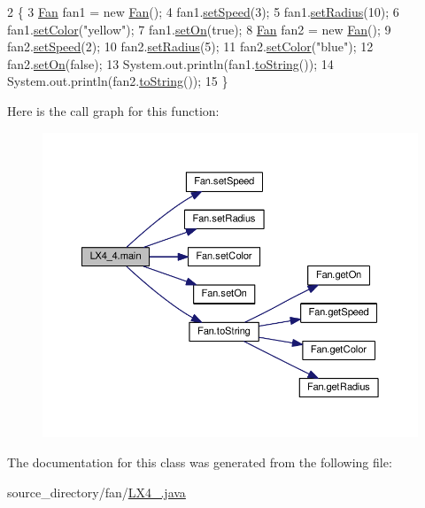 \begin{DoxyCode}
2                                            \{
3         \hyperlink{class_fan}{Fan} fan1 = \textcolor{keyword}{new} \hyperlink{class_fan}{Fan}();
4         fan1.\hyperlink{class_fan_af95cee271f2412a52ac920f00b6ac90a}{setSpeed}(3);
5         fan1.\hyperlink{class_fan_a13134b8be4efdd7403af98d763ce2199}{setRadius}(10);
6         fan1.\hyperlink{class_fan_afef0f6a39b56269a2592dcff067052d8}{setColor}(\textcolor{stringliteral}{"yellow"});
7         fan1.\hyperlink{class_fan_a4f7fd9e0ef71e219270d02ac36ad328b}{setOn}(\textcolor{keyword}{true});
8         \hyperlink{class_fan}{Fan} fan2 = \textcolor{keyword}{new} \hyperlink{class_fan}{Fan}();
9         fan2.\hyperlink{class_fan_af95cee271f2412a52ac920f00b6ac90a}{setSpeed}(2);
10         fan2.\hyperlink{class_fan_a13134b8be4efdd7403af98d763ce2199}{setRadius}(5);
11         fan2.\hyperlink{class_fan_afef0f6a39b56269a2592dcff067052d8}{setColor}(\textcolor{stringliteral}{"blue"});
12         fan2.\hyperlink{class_fan_a4f7fd9e0ef71e219270d02ac36ad328b}{setOn}(\textcolor{keyword}{false});
13         System.out.println(fan1.\hyperlink{class_fan_a23b23cb45d15ed0e80d8a88c9300c5c6}{toString}());
14         System.out.println(fan2.\hyperlink{class_fan_a23b23cb45d15ed0e80d8a88c9300c5c6}{toString}());
15     \}
\end{DoxyCode}


Here is the call graph for this function\+:
\nopagebreak
\begin{figure}[H]
\begin{center}
\leavevmode
\includegraphics[width=350pt]{class_l_x4__4_a6a062de65864f852990c51b8519919b0_cgraph}
\end{center}
\end{figure}




The documentation for this class was generated from the following file\+:\begin{DoxyCompactItemize}
\item 
source\+\_\+directory/fan/\hyperlink{_l_x4__4_8java}{L\+X4\+\_.\+java}\end{DoxyCompactItemize}
